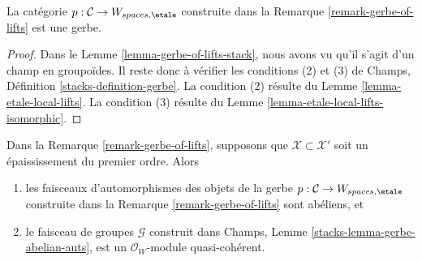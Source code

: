 \begin{lemma}
\label{lemma-gerbe-of-lifts}
La catégorie $p : \mathcal{C} \to W_{spaces, \etale}$ construite
dans la Remarque \ref{remark-gerbe-of-lifts} est une gerbe.
\end{lemma}

\begin{proof}
Dans le Lemme \ref{lemma-gerbe-of-lifts-stack},
nous avons vu qu'il s'agit d'un champ en groupoïdes.
Il reste donc à vérifier les conditions (2) et (3) de
Champs, Définition \ref{stacks-definition-gerbe}.
La condition (2) résulte du
Lemme \ref{lemma-etale-local-lifts}.
La condition (3) résulte du
Lemme \ref{lemma-etale-local-lifts-isomorphic}.
\end{proof}

\begin{lemma}
\label{lemma-gerbe-of-lifts-first-order}
Dans la Remarque \ref{remark-gerbe-of-lifts}, supposons que $\mathcal{X} \subset \mathcal{X}'$
soit un épaississement du premier ordre. Alors
\begin{enumerate}
\item les faisceaux d'automorphismes des objets de la gerbe
$p : \mathcal{C} \to W_{spaces, \etale}$ construite
dans la Remarque \ref{remark-gerbe-of-lifts} sont abéliens, et
\item le faisceau de groupes $\mathcal{G}$ construit dans
Champs, Lemme \ref{stacks-lemma-gerbe-abelian-auts},
est un $\mathcal{O}_W$-module quasi-cohérent.
\end{enumerate}
\end{lemma}

